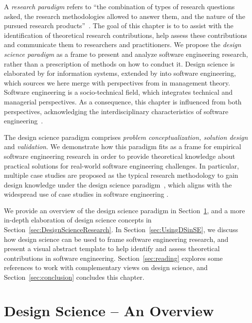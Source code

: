 \documentclass[graybox]{svmult}
\begin{document}
A \emph{research paradigm} refers to ``the combination of types of research questions asked, the research methodologies allowed to answer them, and the nature of the pursued research products''~\citep{van_aken_management_2004}. The goal of  this chapter is to  to assist with the identification of theoretical research contributions, help assess these contributions and communicate them to researchers and practitioners. 
We propose the \emph{design science paradigm} as a frame to present and analyze software engineering research, rather than a prescription of methods on how to conduct it. 
Design science is elaborated by \cite{hevner_design_2004} for information systems, extended by \cite{wieringa_what_2014} into software engineering, which sources we here merge with perspectives from \cite{van_aken_management_2004} in management theory. Software engineering is a socio-technical field, which integrates technical and managerial perspectives. As a consequence, this chapter is influenced from both perspectives, acknowledging the interdisciplinary characteristics of software engineering~\citep{Mendez2019}. 

The design science paradigm comprises \emph{problem conceptualization, solution design} and \emph{validation}. We demonstrate how this paradigm fits as a frame for empirical software engineering research in order to provide theoretical knowledge about practical solutions for real-world software engineering challenges. In particular, multiple case studies are proposed as the typical research methodology to gain design knowledge under the design science paradigm~\citep{van_aken_management_2004}, which aligns with the widespread use of case studies in software engineering \citep{Garousi2019}. 

We provide an overview of the design science paradigm in Section~\ref{sec:overview}, and a more in-depth elaboration of design science concepts in Section~\ref{sec:DesignScienceResearch}. In Section~\ref{sec:UsingDSinSE}, we discuss how design science can be used to frame software engineering research, and present a visual abstract template to help identify and assess theoretical contributions in software engineering. Section~\ref{sec:reading} explores some references to work with complementary views on design science, and Section~\ref{sec:conclusion} concludes this chapter.


\section{Design Science -- An Overview}
\label{sec:overview}
\end{document}
